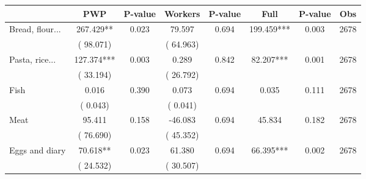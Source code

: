 
\begin{tabular}{l*{7}{c}}\hline&\multicolumn{1}{c}{PWP}&\multicolumn{1}{c}{P-value}&\multicolumn{1}{c}{Workers}&\multicolumn{1}{c}{P-value}&\multicolumn{1}{c}{Full}&\multicolumn{1}{c}{P-value}&\multicolumn{1}{c}{Obs} \\ \hline

 Bread, flour...       &            267.429**       &        0.023  &             79.597       &        0.694  &            199.459***       &              0.003 &  2678 \\ 
                       &       (      98.071)             &                               &       (      64.963)                     &                               &                                               &                                &                      \\ 

 Pasta, rice...       &            127.374***       &        0.003  &              0.289       &        0.842  &             82.207***       &              0.001 &  2678 \\ 
                       &       (      33.194)             &                               &       (      26.792)                     &                               &                                               &                                &                      \\ 

 Fish       &              0.016       &        0.390  &              0.073       &        0.694  &              0.035       &              0.111 &  2678 \\ 
                       &       (       0.043)             &                               &       (       0.041)                     &                               &                                               &                                &                      \\ 

 Meat       &             95.411       &        0.158  &            -46.083       &        0.694  &             45.834       &              0.182 &  2678 \\ 
                       &       (      76.690)             &                               &       (      45.352)                     &                               &                                               &                                &                      \\ 

 Eggs and diary       &             70.618**       &        0.023  &             61.380       &        0.694  &             66.395***       &              0.002 &  2678 \\ 
                       &       (      24.532)             &                               &       (      30.507)                     &                               &                                               &                                &                      \\ 


\end{tabular}
